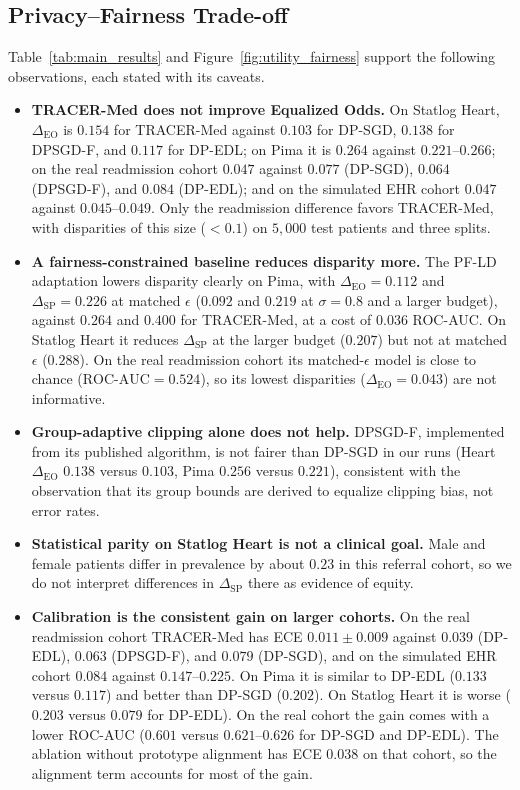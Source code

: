 \documentclass[3p,12pt]{elsarticle}
\theoremstyle{plain}
\theoremstyle{definition}
\begin{document}
\subsection{Privacy--Fairness Trade-off}
Table~\ref{tab:main_results} and Figure~\ref{fig:utility_fairness} support the following observations, each stated with its caveats.
\begin{itemize}
    \item \textbf{TRACER-Med does not improve Equalized Odds.} On Statlog Heart, $\Delta_{\text{EO}}$ is $0.154$ for TRACER-Med against $0.103$ for DP-SGD, $0.138$ for DPSGD-F, and $0.117$ for DP-EDL; on Pima it is $0.264$ against $0.221$--$0.266$; on the real readmission cohort $0.047$ against $0.077$ (DP-SGD), $0.064$ (DPSGD-F), and $0.084$ (DP-EDL); and on the simulated EHR cohort $0.047$ against $0.045$--$0.049$. Only the readmission difference favors TRACER-Med, with disparities of this size ($<0.1$) on $5{,}000$ test patients and three splits.
    \item \textbf{A fairness-constrained baseline reduces disparity more.} The PF-LD adaptation lowers disparity clearly on Pima, with $\Delta_{\text{EO}} = 0.112$ and $\Delta_{\text{SP}} = 0.226$ at matched $\epsilon$ ($0.092$ and $0.219$ at $\sigma=0.8$ and a larger budget), against $0.264$ and $0.400$ for TRACER-Med, at a cost of $0.036$ ROC-AUC. On Statlog Heart it reduces $\Delta_{\text{SP}}$ at the larger budget ($0.207$) but not at matched $\epsilon$ ($0.288$). On the real readmission cohort its matched-$\epsilon$ model is close to chance ($\text{ROC-AUC}=0.524$), so its lowest disparities ($\Delta_{\text{EO}}=0.043$) are not informative.
    \item \textbf{Group-adaptive clipping alone does not help.} DPSGD-F, implemented from its published algorithm, is not fairer than DP-SGD in our runs (Heart $\Delta_{\text{EO}}$ $0.138$ versus $0.103$, Pima $0.256$ versus $0.221$), consistent with the observation that its group bounds are derived to equalize clipping bias, not error rates.
    \item \textbf{Statistical parity on Statlog Heart is not a clinical goal.} Male and female patients differ in prevalence by about $0.23$ in this referral cohort, so we do not interpret differences in $\Delta_{\text{SP}}$ there as evidence of equity.
    \item \textbf{Calibration is the consistent gain on larger cohorts.} On the real readmission cohort TRACER-Med has ECE $0.011 \pm 0.009$ against $0.039$ (DP-EDL), $0.063$ (DPSGD-F), and $0.079$ (DP-SGD), and on the simulated EHR cohort $0.084$ against $0.147$--$0.225$. On Pima it is similar to DP-EDL ($0.133$ versus $0.117$) and better than DP-SGD ($0.202$). On Statlog Heart it is worse ($0.203$ versus $0.079$ for DP-EDL). On the real cohort the gain comes with a lower ROC-AUC ($0.601$ versus $0.621$--$0.626$ for DP-SGD and DP-EDL). The ablation without prototype alignment has ECE $0.038$ on that cohort, so the alignment term accounts for most of the gain.
\end{itemize}
\end{document}
